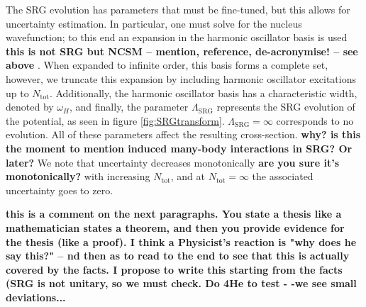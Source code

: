 \documentclass[a4paper,11pt]{article}
\newcommand{\Ntot}{N_{\mathrm{tot}}}
\newcommand{\LamSRG}{\Lambda_{\mathrm{SRG}}}
\newcommand{\com}[1]{\color{blue}\small\textbf{ #1 }\color{black}\normalsize}
\begin{document}
The SRG evolution has parameters that must be fine-tuned, but this
allows for uncertainty estimation.
In particular, one must solve for the nucleus wavefunction; 
to this end an expansion in the harmonic oscillator basis is used \com{this is not SRG but NCSM -- mention, reference, de-acronymise! -- see above}.
When expanded to infinite order, this basis forms a complete set,
however, we truncate this expansion by including harmonic oscillator excitations up to $\Ntot$.
Additionally, the harmonic oscillator basis has a characteristic
width, denoted by $\omega_H$, and finally, the parameter $\LamSRG$
represents the SRG evolution of the potential, as seen in figure
\ref{fig:SRGtransform}. $\LamSRG=\infty$ corresponds to no evolution.
All of these parameters affect the resulting cross-section. \com{why? is this the moment to mention induced many-body interactions in SRG? Or later?}
We note that uncertainty decreases monotonically\com{are you sure it's monotonically?} with increasing
$\Ntot$, and at $\Ntot=\infty$ the associated uncertainty goes to zero.

\com{this is a comment on the next paragraphs. You state a thesis like a mathematician states a theorem, and then you provide evidence for the thesis (like a proof). I think a Physicist's reaction is "why does he say this?" -- nd then as to read to the end to see that this is actually covered by the facts. I propose to write this starting from the facts (SRG is not unitary, so we must check. Do 4He to test - -we see small deviations...}
\end{document}
